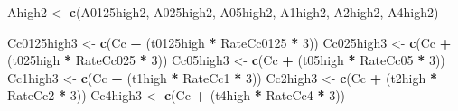 \documentclass[
]{krantz}
\makeatletter
\newenvironment{Shaded}{\begin{snugshade}}{\end{snugshade}}
\newcommand{\DecValTok}[1]{\textcolor[rgb]{0.00,0.00,0.81}{#1}}
\newcommand{\KeywordTok}[1]{\textcolor[rgb]{0.13,0.29,0.53}{\textbf{#1}}}
\newcommand{\NormalTok}[1]{#1}
\newcommand{\OperatorTok}[1]{\textcolor[rgb]{0.81,0.36,0.00}{\textbf{#1}}}
\newcommand{\StringTok}[1]{\textcolor[rgb]{0.31,0.60,0.02}{#1}}
\newenvironment{kframe}{%
\medskip{}
\setlength{\fboxsep}{.8em}
 \def\at@end@of@kframe{}%
 \ifinner\ifhmode%
  \def\at@end@of@kframe{\end{minipage}}%
  \begin{minipage}{\columnwidth}%
 \fi\fi%
 \def\FrameCommand##1{\hskip\@totalleftmargin \hskip-\fboxsep
 \colorbox{shadecolor}{##1}\hskip-\fboxsep
     \hskip-\linewidth \hskip-\@totalleftmargin \hskip\columnwidth}%
 \MakeFramed {\advance\hsize-\width
   \@totalleftmargin\z@ \linewidth\hsize
   \@setminipage}}%
 {\par\unskip\endMakeFramed%
 \at@end@of@kframe}
\renewenvironment{Shaded}{\begin{kframe}}{\end{kframe}}
\makeatother
\begin{document}
\begin{Shaded}
\begin{Highlighting}[]
\NormalTok{Ahigh2 <-}
\StringTok{  }\KeywordTok{c}\NormalTok{(A0125high2, A025high2, A05high2, A1high2, A2high2, A4high2)}

\NormalTok{Cc0125high3 <-}\StringTok{ }\KeywordTok{c}\NormalTok{(Cc }\OperatorTok{+}\StringTok{ }\NormalTok{(t0125high }\OperatorTok{*}\StringTok{ }\NormalTok{RateCc0125 }\OperatorTok{*}\StringTok{ }\DecValTok{3}\NormalTok{))}
\NormalTok{Cc025high3 <-}\StringTok{ }\KeywordTok{c}\NormalTok{(Cc }\OperatorTok{+}\StringTok{ }\NormalTok{(t025high }\OperatorTok{*}\StringTok{ }\NormalTok{RateCc025 }\OperatorTok{*}\StringTok{ }\DecValTok{3}\NormalTok{))}
\NormalTok{Cc05high3 <-}\StringTok{ }\KeywordTok{c}\NormalTok{(Cc }\OperatorTok{+}\StringTok{ }\NormalTok{(t05high }\OperatorTok{*}\StringTok{ }\NormalTok{RateCc05 }\OperatorTok{*}\StringTok{ }\DecValTok{3}\NormalTok{))}
\NormalTok{Cc1high3 <-}\StringTok{ }\KeywordTok{c}\NormalTok{(Cc }\OperatorTok{+}\StringTok{ }\NormalTok{(t1high }\OperatorTok{*}\StringTok{ }\NormalTok{RateCc1 }\OperatorTok{*}\StringTok{ }\DecValTok{3}\NormalTok{))}
\NormalTok{Cc2high3 <-}\StringTok{ }\KeywordTok{c}\NormalTok{(Cc }\OperatorTok{+}\StringTok{ }\NormalTok{(t2high }\OperatorTok{*}\StringTok{ }\NormalTok{RateCc2 }\OperatorTok{*}\StringTok{ }\DecValTok{3}\NormalTok{))}
\NormalTok{Cc4high3 <-}\StringTok{ }\KeywordTok{c}\NormalTok{(Cc }\OperatorTok{+}\StringTok{ }\NormalTok{(t4high }\OperatorTok{*}\StringTok{ }\NormalTok{RateCc4 }\OperatorTok{*}\StringTok{ }\DecValTok{3}\NormalTok{))}


\end{Highlighting}
\end{Shaded}
\end{document}
